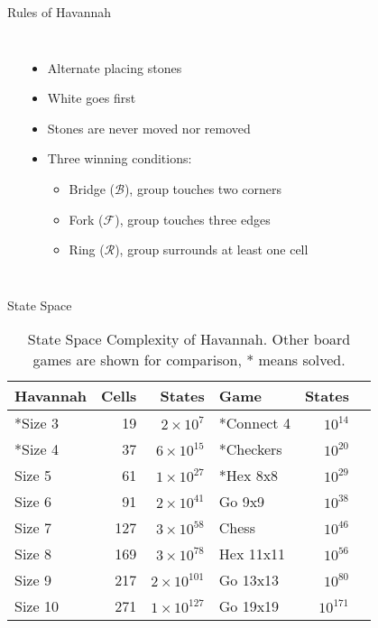 \documentclass{beamer} %
\begin{document}
\begin{frame}{Rules of Havannah}
\begin{columns}
\begin{center}
\begin{HavannahBoard}[board size=6,coordinate style=classical,show coordinates=false]
\end{HavannahBoard}
\end{center}

\begin{itemize}
\item Alternate placing stones
\item White goes first
\item Stones are never moved nor removed
\item Three winning conditions:
	\begin{itemize}
		\item Bridge ($\mathcal B$), group touches two corners
		\item Fork ($\mathcal F$), group touches three edges
		\item Ring ($\mathcal R$), group surrounds at least one cell
	\end{itemize}
\end{itemize}
\end{columns}
\end{frame}


\begin{frame}{State Space}
\begin{table}
	\centering
	\begin{tabular}{lrr|lrc}
	Havannah  & Cells & States              & Game       & States     \\ \hline
	*Size 3   &    19 & $2 \times 10^{7}$   & *Connect 4 & $10^{14}$  \\
	*Size 4   &    37 & $6 \times 10^{15}$  & *Checkers  & $10^{20}$  \\
	Size 5    &    61 & $1 \times 10^{27}$  & *Hex 8x8   & $10^{29}$  \\
	Size 6    &    91 & $2 \times 10^{41}$  & Go 9x9     & $10^{38}$  \\
	Size 7    &   127 & $3 \times 10^{58}$  & Chess      & $10^{46}$  \\
	Size 8    &   169 & $3 \times 10^{78}$  & Hex 11x11  & $10^{56}$  \\
	Size 9    &   217 & $2 \times 10^{101}$ & Go 13x13   & $10^{80}$  \\
	Size 10   &   271 & $1 \times 10^{127}$ & Go 19x19   & $10^{171}$ \\
	\end{tabular}
	\caption[State Space Complexity of Havannah]{State Space Complexity of Havannah. Other board games are shown for comparison, * means solved.}
	\label{table:complexity}
\end{table}
\end{frame}
\end{document}
